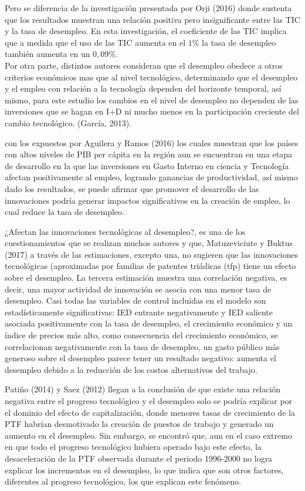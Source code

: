 Pero se diferencia de la investigación presentada por Orji (2016) donde sustenta que los resultados muestran una relación positiva pero insignificante entre las TIC y la tasa de desempleo.  En esta investigación, el coeficiente de las TIC implica que a medida que el uso de las TIC aumenta en el $1\%$ la tasa de desempleo también aumenta en un $0,09\%$.\\

 Por otra parte, distintos autores consideran que el desempleo obedece a otros criterios económicos mas que al nivel tecnológico, determinando que el desempleo y el empleo con relación a la tecnología dependen del horizonte temporal, así mismo, para este estudio los cambios en el nivel de desempleo no dependen de las inversiones que se hagan en I+D ni mucho menos en la participación creciente del cambio tecnológico. (García, 2013). 

con los expuestos por Aguilera y Ramos (2016) los cuales muestran que los países con altos niveles de PIB per cápita en la región aun se encuentran en una etapa de desarrollo en la que las inversiones en Gasto Interno en ciencia y Tecnología afectan positivamente al empleo, logrando ganancias de productividad, así mismo dado los resultados, se puede afirmar que promover el desarrollo de las innovaciones podría generar impactos significativos en la creación de empleo, lo cual reduce la tasa de desempleo.

¿Afectan las innovaciones tecnológicas al desempleo?, es una de los cuestionamientos que se
realizan muchos autores y que, Matuzeviciute y Buktus (2017) a través de las estimaciones,
excepto una, no sugieren que las innovaciones tecnológicas (aproximadas por familias de patentes triádicas (tfp) tiene un efecto sobre el desempleo. La tercera estimación muestra una correlación negativa, es decir, una mayor actividad de innovación se asocia con una menor tasa
de desempleo. Casi todas las variables de control incluidas en el modelo son estadísticamente
significativas: IED entrante negativamente y IED saliente asociada positivamente con la tasa
de desempleo, el crecimiento económico y un índice de precios más alto, como consecuencia
del crecimiento económico, se correlacionan negativamente con la tasa de desempleo, un gasto
público más generoso sobre el desempleo parece tener un resultado negativo: aumenta el desempleo debido a la reducción de los costos alternativos del trabajo.

Patiño (2014) y Saez (2012) llegan a la conclusión de que existe una relación negativa entre el
progreso tecnológico y el desempleo solo se podría explicar por el dominio del efecto de capitalización, donde menores tasas de crecimiento de la PTF habrían desmotivado la creación de
puestos de trabajo y generado un aumento en el desempleo. Sin embargo, se encontró que, aun
en el caso extremo en que todo el progreso tecnológico hubiera operado bajo este efecto, la desaceleración de la PTF observada durante el periodo 1996-2000 no logra explicar los incrementos en el desempleo, lo que indica que son otros factores, diferentes al progreso tecnológico, los
que explican este fenómeno.

